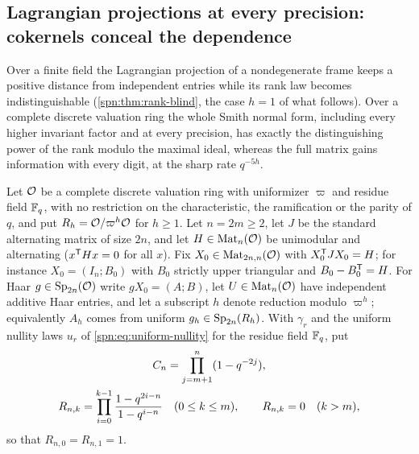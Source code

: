 
\subsection{Lagrangian projections at every precision: cokernels conceal the dependence}\label{spn:sec:local}

Over a finite field the Lagrangian projection of a nondegenerate frame keeps a positive distance from
independent entries while its rank law becomes indistinguishable (\cref{spn:thm:rank-blind}, the case
$h=1$ of what follows). Over a
complete discrete valuation ring the whole Smith normal form, including every higher invariant
factor and at every precision, has exactly the distinguishing power of the rank modulo the maximal
ideal, whereas the full matrix gains information with every digit, at the sharp rate $q^{-5h}$.

Let $\mathcal{O}$ be a complete discrete valuation ring with uniformizer $\varpi$ and residue field $\mathbb{F}_q$,
with no restriction on the characteristic, the ramification or the parity of $q$, and put
$R_h=\mathcal{O}/\varpi^h\mathcal{O}$ for $h\ge1$. Let $n=2m\ge2$, let $J$ be the standard alternating matrix of size
$2n$, and let $H\in\operatorname{Mat}_n(\mathcal{O})$ be unimodular and alternating ($x^{\mathsf{T}}Hx=0$ for all $x$). Fix
$X_0\in\operatorname{Mat}_{2n,n}(\mathcal{O})$ with $X_0^{\mathsf{T}}JX_0=H$; for instance $X_0=(I_n;B_0)$ with $B_0$ strictly upper
triangular and $B_0-B_0^{\mathsf{T}}=H$. For Haar $g\in\operatorname{Sp}_{2n}(\mathcal{O})$ write $gX_0=(A;B)$, let $U\in\operatorname{Mat}_n(\mathcal{O})$
have independent additive Haar entries, and let a subscript $h$ denote reduction modulo $\varpi^h$;
equivalently $A_h$ comes from uniform $g_h\in\operatorname{Sp}_{2n}(R_h)$. With $\gamma_r$ and the uniform
nullity laws $u_r$ of \eqref{spn:eq:uniform-nullity} for the residue field $\mathbb{F}_q$, put
\begin{gather}
 C_n=\prod_{j=m+1}^n(1-q^{-2j}),\notag\\
 R_{n,k}=\prod_{i=0}^{k-1}\frac{1-q^{2i-n}}{1-q^{i-n}}\quad(0\le k\le m),\qquad R_{n,k}=0\quad(k>m),
 \label{spn:eq:local-Rnk}
\end{gather}
so that $R_{n,0}=R_{n,1}=1$.

